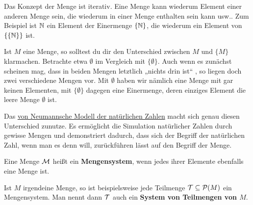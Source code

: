 \begin{vorschau}
    Das Konzept der Menge ist iterativ. Eine Menge kann wiederum Element einer anderen Menge sein, die wiederum in einer Menge enthalten sein kann usw.. Zum Beispiel ist $\mathbb N$ ein Element der Einermenge $\{\mathbb N\}$, die wiederum ein Element von $\{ \{\mathbb N \}\}$ ist.

    Ist $M$ eine Menge, so solltest du dir den Unterschied zwischen $M$ und $\{M\}$ klarmachen. Betrachte etwa $\emptyset$ im Vergleich mit $\{\emptyset\}$. Auch wenn es zunächst scheinen mag, dass in beiden Mengen letztlich „nichts drin ist“ , so liegen doch zwei verschiedene Mengen vor. Mit $\emptyset$ haben wir nämlich eine Menge mit gar keinen Elementen, mit $\{\emptyset\}$ dagegen eine Einermenge, deren einziges Element die leere Menge $\emptyset$ ist.

    Das \href{https://de.wikipedia.org/wiki/Nat\%C3\%BCrliche_Zahl#Von_Neumanns_Modell_der_nat\%C3\%BCrlichen_Zahlen}{von Neumannsche Modell der natürlichen Zahlen} macht sich genau diesen Unterschied zunutze. Es ermöglicht die Simulation natürlicher Zahlen durch gewisse Mengen und demonstriert dadurch, dass sich der Begriff der natürlichen Zahl, wenn man es denn will, zurückführen lässt auf den Begriff der Menge.
\end{vorschau}


\begin{de}[Mengensystem] 
    Eine Menge $\mathcal M$ heißt ein \textbf{Mengensystem}, wenn jedes ihrer Elemente ebenfalls eine Menge ist.

    Ist $M$ irgendeine Menge, so ist beispielsweise jede Teilmenge $\mathcal T\subseteq \mathcal P(M)$ ein Mengensystem. Man nennt dann $\mathcal T$ auch ein \textbf{System von Teilmengen von $M$}.
\end{de}



